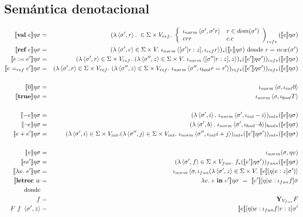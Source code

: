   \subsection{Semántica denotacional}
    \begin{eqnarray*}
      \se{\textbf{val}\ e}\eta\s &=& (\lambda \la\s',r\ra.\ \in \Sigma \times V_{ref}.
        \ \left\lbrace 
        \begin{array}{lll}
          \iota_{norm} \la\s',\s' r\ra & r\in dom(\s') \\
          err & c.c
        \end{array}\right)_{ref*} (\se{e}\eta\s) \\
      \se{\textbf{ref} \ e}\eta\s &=& (\lambda \la\s',r\ra \in \Sigma \times V.\ \iota_{norm}\la[\s'|r:z],\iota_{ref}r\ra)_* (\se{e}\eta\s) \text{ donde } r = new(\sigma')\\
      \se{e:=e'}\eta\s &=& (\lambda \la\s',r\ra \in \Sigma \times V_{ref}.\ (\lambda \la\s'',z\ra \in \Sigma \times V.\ \iota_{norm} \la[\s''|r:z],z\ra)_* (\se{e'}\eta\s') )_{ref*} (\se{e}\eta\s) \\
      \se{e=_{ref}e'}\eta\s &=& (\lambda \la\s',r\ra \in \Sigma \times V_{ref}.\ (\lambda \la\s'',z\ra \in \Sigma \times V_{ref}.\ \iota_{norm} \la\s'',\iota_{bool}r=r'\ra)_{ref*} (\se{e'}\eta\s') )_{ref*}(\se{e}\eta\s) \\ \\
      \se{0}\eta\s &=& \iota_{norm}\la \s,\iota_{int}0\ra \\
      \se{\textbf{true}}\eta\s &=& \iota_{norm}\la \s,\iota_{bool}T\ra \\ \\
      \se{-e}\eta\s &=& (\lambda \la \s',i\ra.\ \iota_{norm}\la \s',\iota_{int}-i\ra)_{int*}(\se{e}\eta\s) \\
      \se{\neg e}\eta\s &=& (\lambda \la \s',b\ra.\ \iota_{norm}\la \s',\iota_{bool}\neg b\ra)_{bool*}(\se{e}\eta\s) \\
      \se{e+e'}\eta\s &=& (\lambda \la \s',i\ra \in \Sigma \times V_{int}.(\lambda \la \s'',j\ra \in \Sigma \times V_{int}.\  \iota_{norm}\la \s'',\iota_{int}i+j\ra)_{int*}(\se{e'}\eta\s'))_{int*}(\se{e}\eta\s) \\ \\
      \se{v}\eta\s &=& \iota_{norm}(\s, \eta v) \\
      \se{ee'}\eta\s &=& (\lambda \la \s',f\ra \in \Sigma \times V_{fun}.\ f_* (\se{e'}\eta\s'))_{fun*}(\se{e}\eta\s) \\
      \se{\lambda v.\  e'}\eta\s &=&  \iota_{norm}\la \s, \iota_{fun}(\lambda \la\s',z\ra \in \Sigma \times V.\ \se{e}[\eta|v:z]\s')\ra \\
      \se{\textbf{letrec}\ w &=& \lambda v.\  e\ine e'}\eta\s \ = \ \se{e'}[\eta|w:\iota_{fun}f]\s \\
      \text{donde} && \\
      f &=& \textbf{Y}_{V_{fun}}F \\
      F\ f \ \la\s',z\ra &=& \se{e}[\eta|w:\iota_{fun} f|v:z]\s'
    \end{eqnarray*}

